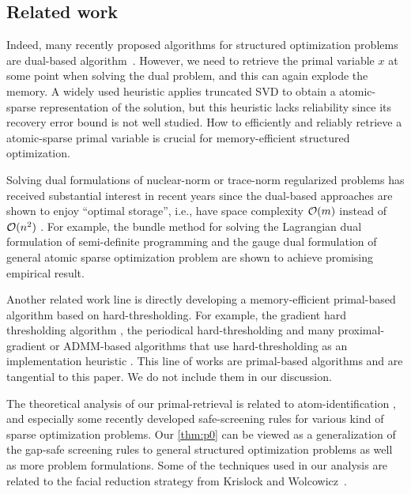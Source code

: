 \subsection{Related work}

Indeed, many recently proposed algorithms for structured optimization problems are dual-based algorithm~\cite{fan2019bundle,DingYCTU21}.  However, we need to retrieve the primal variable $x$ at some point when solving the dual problem, and this can again explode the memory. A widely used heuristic applies truncated SVD \cite[Algorithm~6.4]{fan2019alignment} to obtain a atomic-sparse representation of the solution, but this heuristic lacks reliability since its recovery error bound is not well studied. How to efficiently and reliably retrieve a atomic-sparse primal variable is crucial for memory-efficient structured optimization.

Solving dual formulations of nuclear-norm or trace-norm regularized problems has received substantial interest in recent years since the dual-based approaches are shown to enjoy ``optimal storage'', i.e., have space complexity $\mathcal{O}(m)$ instead of $\mathcal{O}( n^2 )$ \cite{DingYCTU21}. For example, the bundle method for solving the Lagrangian dual formulation of semi-definite programming \cite{helmberg2000spectral} and the gauge dual formulation of general atomic sparse optimization problem \cite{fan2019bundle} are shown to achieve promising empirical result.

Another related work line is directly developing a memory-efficient primal-based algorithm based on hard-thresholding. For example, the gradient hard thresholding algorithm \cite{YuanLZ17}, the periodical hard-thresholding \cite{Allen-ZhuHHL17} and many proximal-gradient or ADMM-based algorithms that use hard-thresholding as an implementation heuristic \cite{mazumder2010spectral,Lin11,hsieh2014nuclear}. This line of works are primal-based algorithms and are tangential to this paper. We do not include them in our discussion. 

The theoretical analysis of our primal-retrieval is related to atom-identification \cite{BurM88,hare2004identifying,hare2011identifying}, and especially some recently developed safe-screening rules \cite{Ghaoui12,wang2013lasso,liu2014safe,WangZLWY14,Raj2015ScreeningRF,BonnefoyERG15,XiangWR17,NdiayeFGS17,ZhangHLYCHW17,kuang2017screening,Atamtrk2020SafeSR,Bao20} for various kind of sparse optimization problems. Our \autoref{thm:p0} can be viewed as a generalization of the gap-safe screening rules to general structured optimization problems as well as more problem formulations. Some of the techniques used in our analysis are related to the facial reduction strategy from Krislock and Wolcowicz~\cite{krislock2010explicit}. 



